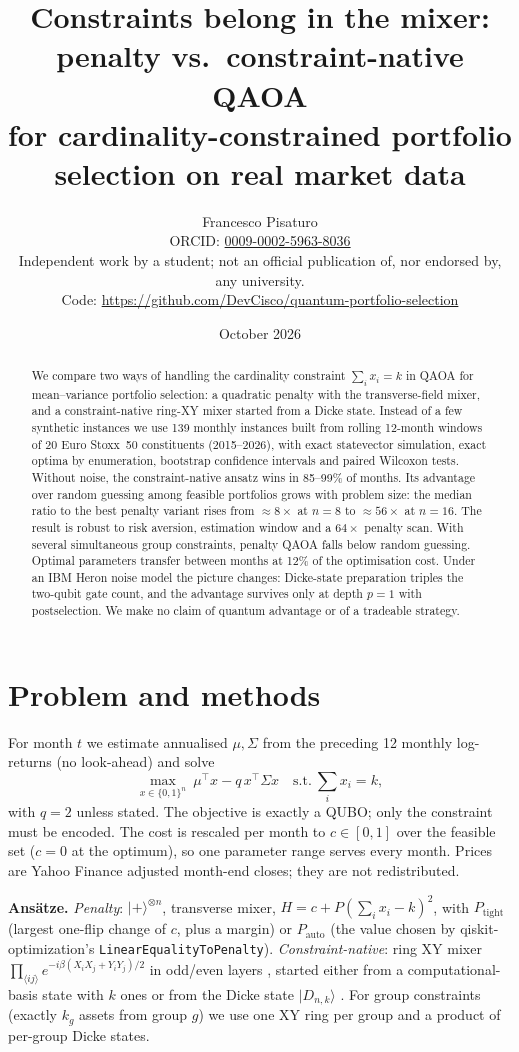 \documentclass[10pt,a4paper,twocolumn]{article}
\title{Constraints belong in the mixer: penalty vs.\ constraint-native QAOA\\ for cardinality-constrained portfolio selection on real market data}
\author{Francesco Pisaturo\\[2pt]
{\small ORCID: \href{https://orcid.org/0009-0002-5963-8036}{0009-0002-5963-8036}}\\[2pt]
{\small Independent work by a student; not an official publication of, nor endorsed by, any university.}\\[2pt]
{\small Code: \url{https://github.com/DevCisco/quantum-portfolio-selection}}}
\date{October 2026}
\begin{document}
\maketitle
\begin{abstract}
We compare two ways of handling the cardinality constraint $\sum_i x_i=k$ in QAOA for mean--variance portfolio selection: a quadratic penalty with the transverse-field mixer, and a constraint-native ring-XY mixer started from a Dicke state. Instead of a few synthetic instances we use 139 monthly instances built from rolling 12-month windows of 20 Euro Stoxx~50 constituents (2015--2026), with exact statevector simulation, exact optima by enumeration, bootstrap confidence intervals and paired Wilcoxon tests. Without noise, the constraint-native ansatz wins in 85--99\% of months. Its advantage over random guessing among feasible portfolios grows with problem size: the median ratio to the best penalty variant rises from $\approx 8\times$ at $n=8$ to $\approx 56\times$ at $n=16$. The result is robust to risk aversion, estimation window and a $64\times$ penalty scan. With several simultaneous group constraints, penalty QAOA falls below random guessing. Optimal parameters transfer between months at 12\% of the optimisation cost. Under an IBM Heron noise model the picture changes: Dicke-state preparation triples the two-qubit gate count, and the advantage survives only at depth $p=1$ with postselection. We make no claim of quantum advantage or of a tradeable strategy.
\end{abstract}

\section{Problem and methods}
For month $t$ we estimate annualised $\mu,\Sigma$ from the preceding 12 monthly log-returns (no look-ahead) and solve
\begin{equation}
\max_{x\in\{0,1\}^n}\ \mu^\top x-q\,x^\top\Sigma x\quad\text{s.t.}\ \textstyle\sum_i x_i=k,
\end{equation}
with $q=2$ unless stated. The objective is exactly a QUBO; only the constraint must be encoded. The cost is rescaled per month to $c\in[0,1]$ over the feasible set ($c=0$ at the optimum), so one parameter range serves every month. Prices are Yahoo Finance adjusted month-end closes; they are not redistributed.

\textbf{Ansätze.} \emph{Penalty}: $|+\rangle^{\otimes n}$, transverse mixer, $H=c+P(\sum_i x_i-k)^2$, with $P_\text{tight}$ (largest one-flip change of $c$, plus a margin) or $P_\text{auto}$ (the value chosen by qiskit-optimization's \texttt{LinearEqualityToPenalty}). \emph{Constraint-native}: ring XY mixer $\prod_{\langle ij\rangle}e^{-i\beta(X_iX_j+Y_iY_j)/2}$ in odd/even layers \cite{hadfield2019,wang2020}, started either from a computational-basis state with $k$ ones or from the Dicke state $|D_{n,k}\rangle$ \cite{bartschi2019}. For group constraints (exactly $k_g$ assets from group $g$) we use one XY ring per group and a product of per-group Dicke states.
\end{document}
